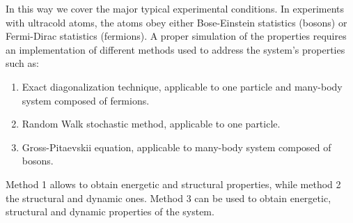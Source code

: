 \documentclass{article}
\begin{document}
In this way we cover the major typical experimental conditions. In experiments with ultracold 
atoms, the atoms obey either Bose-Einstein statistics (bosons) or Fermi-Dirac statistics 
(fermions). A proper simulation of the properties requires an implementation of different 
methods used to address the system's properties such as:

\begin{enumerate}
    \item Exact diagonalization technique, applicable to one particle and many-body system 
    composed of fermions.
    \item Random Walk stochastic method, applicable to one particle.
    \item Gross-Pitaevskii equation, applicable to many-body system composed of bosons.
\end{enumerate}
Method 1 allows to obtain energetic and structural properties, while method 2 the structural 
and dynamic ones. Method 3 can be used to obtain energetic, structural and dynamic properties 
of the system.
\end{document}

